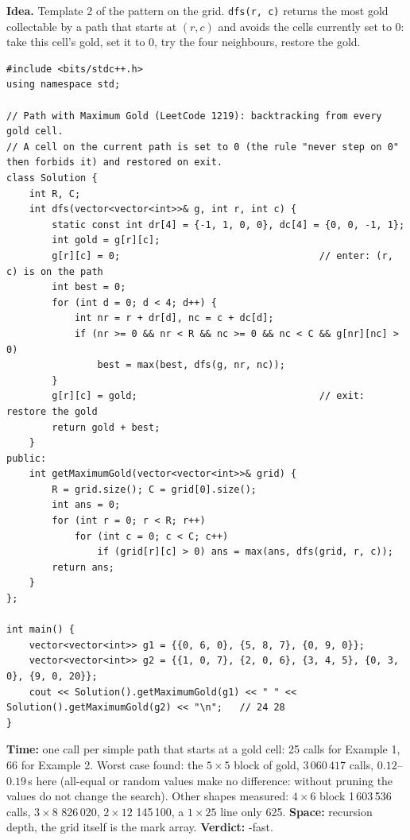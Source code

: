 \begin{algorithmbox}
\textbf{Idea.} Template 2 of the pattern on the grid. \texttt{dfs(r, c)} returns the most gold collectable by a path that starts at $(r,c)$ and avoids the cells currently set to 0: take this cell's gold, set it to 0, try the four neighbours, restore the gold.

\begin{lstlisting}[style=cpp]
#include <bits/stdc++.h>
using namespace std;

// Path with Maximum Gold (LeetCode 1219): backtracking from every gold cell.
// A cell on the current path is set to 0 (the rule "never step on 0" then forbids it) and restored on exit.
class Solution {
    int R, C;
    int dfs(vector<vector<int>>& g, int r, int c) {
        static const int dr[4] = {-1, 1, 0, 0}, dc[4] = {0, 0, -1, 1};
        int gold = g[r][c];
        g[r][c] = 0;                                   // enter: (r, c) is on the path
        int best = 0;
        for (int d = 0; d < 4; d++) {
            int nr = r + dr[d], nc = c + dc[d];
            if (nr >= 0 && nr < R && nc >= 0 && nc < C && g[nr][nc] > 0)
                best = max(best, dfs(g, nr, nc));
        }
        g[r][c] = gold;                                // exit: restore the gold
        return gold + best;
    }
public:
    int getMaximumGold(vector<vector<int>>& grid) {
        R = grid.size(); C = grid[0].size();
        int ans = 0;
        for (int r = 0; r < R; r++)
            for (int c = 0; c < C; c++)
                if (grid[r][c] > 0) ans = max(ans, dfs(grid, r, c));
        return ans;
    }
};

int main() {
    vector<vector<int>> g1 = {{0, 6, 0}, {5, 8, 7}, {0, 9, 0}};
    vector<vector<int>> g2 = {{1, 0, 7}, {2, 0, 6}, {3, 4, 5}, {0, 3, 0}, {9, 0, 20}};
    cout << Solution().getMaximumGold(g1) << " " << Solution().getMaximumGold(g2) << "\n";   // 24 28
}
\end{lstlisting}

\begin{complexitybox}
\textbf{Time:} one call per simple path that starts at a gold cell: 25 calls for Example 1, 66 for Example 2. Worst case found: the $5 \times 5$ block of gold, $3\,060\,417$ calls, $0.12$--$0.19$\,s here (all-equal or random values make no difference: without pruning the values do not change the search). Other shapes measured: $4 \times 6$ block 1\,603\,536 calls, $3 \times 8$ 826\,020, $2 \times 12$ 145\,100, a $1 \times 25$ line only 625. \textbf{Space:}  recursion depth, the grid itself is the mark array. \textbf{Verdict:} \ac{}-fast.
\end{complexitybox}
\end{algorithmbox}

